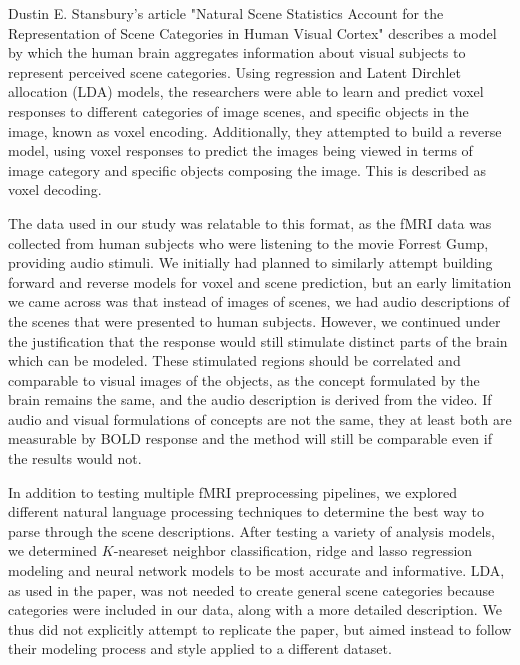 \par Dustin E. Stansbury's article "Natural Scene Statistics Account for the Representation of 
Scene Categories in Human Visual Cortex" describes a model by which the human brain 
aggregates information about visual subjects to represent perceived scene categories. Using regression and Latent Dirchlet allocation (LDA) models, the researchers were able to learn and predict voxel responses to different categories of image scenes, and specific objects in the image, known as voxel encoding. Additionally, they attempted to build a reverse  model, using voxel responses to predict the images being viewed in terms of image category and specific objects composing the image. This is described as voxel decoding.

\par The data used in our study was relatable to this format, as the fMRI data was collected from human subjects who were listening to the movie Forrest Gump, providing audio stimuli. We initially had planned to similarly attempt building forward and reverse models for voxel and scene prediction, but an early limitation we came across was that instead of images of scenes, we had audio descriptions of the scenes that were presented to 
human subjects. However, we continued under the justification that the response would still stimulate distinct parts of the brain which can be modeled. These stimulated regions should be correlated and comparable to visual images of the objects, as the concept formulated by the brain remains the same, and the audio description is derived from the video. If audio and visual formulations of concepts are not the same, they at least both are measurable by BOLD response and the method will still be comparable even if the results would not.

\par In addition to testing multiple fMRI preprocessing pipelines, we explored different natural language processing techniques to determine the best way to parse through the scene descriptions. After testing a variety of analysis models, we determined $K$-neareset neighbor classification, ridge and lasso regression modeling and neural network models to be most accurate and informative. LDA, as used in the paper, was not needed to create general scene categories because categories were included in our data, along with a more detailed description. We thus did not explicitly attempt to replicate the paper, but aimed instead to follow their modeling process and style applied to a different dataset.
